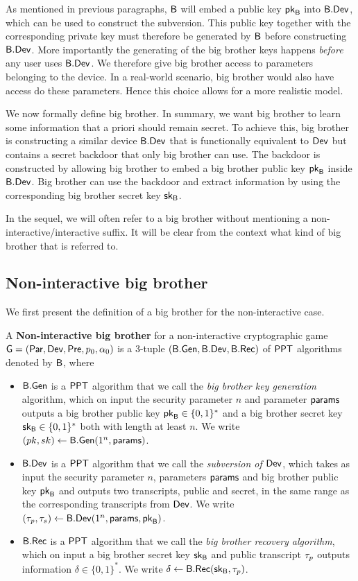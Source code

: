 As mentioned in previous paragraphs, $\mathsf{B}$ will embed a public key $\mathsf{pk}_{\mathsf{B}}$ into $\mathsf{B}.\mathsf{Dev}$, which can be used to construct the subversion. This public key together with the corresponding private key must therefore be generated by $\mathsf{B}$ before constructing $\mathsf{B}.\mathsf{Dev}$. More importantly the generating of the big brother keys happens \emph{before} any user uses $\mathsf{B}.\mathsf{Dev}$. We therefore give big brother access to parameters belonging to the device. In a real-world scenario, big brother would also have access do these parameters. Hence this choice allows for a more realistic model.

We now formally define big brother. In summary, we want big brother to learn some information that a priori should remain secret. To achieve this, big brother is constructing a similar device $\mathsf{B}.\mathsf{Dev}$ that is functionally equivalent to $\operatorname{\mathsf{Dev}}$ but contains a secret backdoor that only big brother can use. The backdoor is constructed by allowing big brother to embed a big brother public key $\mathsf{pk}_{\mathsf{B}}$ inside $\mathsf{B}.\mathsf{Dev}$. Big brother can use the backdoor and extract information by using the corresponding big brother secret key $\mathsf{sk}_{\mathsf{B}}$. 

In the sequel, we will often refer to a big brother without mentioning a non-interactive/interactive suffix. It will be clear from the context what kind of big brother that is referred to.

\subsection{Non-interactive big brother}

We first present the definition of a big brother for the non-interactive case. 

\begin{defn}
	A \textbf{Non-interactive big brother} for a non-interactive cryptographic game $\operatorname{\mathsf{G}}=\left(\operatorname{\mathsf{Par}},\operatorname{\mathsf{Dev}},\operatorname{\mathsf{Pre}},p_{0},\alpha_{0}\right)$ is a 3-tuple $(\mathsf{B}.\mathsf{Gen},\mathsf{B}.\mathsf{Dev}, \mathsf{B}.\mathsf{Rec})$ of $\mathsf{PPT}$ algorithms denoted by $\mathsf{B}$, where
	\begin{itemize}
	\itemsep-0.1em
		\item $\mathsf{B}.\mathsf{Gen}$ is a $\mathsf{PPT}$ algorithm that we call the \emph{big brother key generation} algorithm, which on input the security parameter $n$  and parameter $\mathsf{params}$ outputs a big brother public key $\mathsf{pk}_{\mathsf{B}}\in\{0,1\}^*$ and a big brother secret key $\mathsf{sk}_{\mathsf{B}}\in\{0,1\}^*$ both with length at least $n$. We write $(pk,sk)\leftarrow \mathsf{B}.\mathsf{Gen}(1^n, \mathsf{params})$. 
		\item $\mathsf{B}.\mathsf{Dev}$ is a $\mathsf{PPT}$ algorithm that we call the \textit{subversion of $\operatorname{\mathsf{Dev}}$}, which takes as input the security parameter $n$, parameters $\mathsf{params}$ and big brother public key $\mathsf{pk}_{\mathsf{B}}$ and outputs two transcripts, public and secret, in the same range as the corresponding transcripts from $\operatorname{\mathsf{Dev}}$. We write $(\tau_p,\tau_s)\leftarrow \mathsf{B}.\mathsf{Dev}(1^n,\mathsf{params},\mathsf{pk}_{\mathsf{B}})$. 
		\item $\mathsf{B}.\mathsf{Rec}$ is a $\mathsf{PPT}$ algorithm that we call the \textit{big brother recovery algorithm}, which on input a big brother secret key $\mathsf{sk}_{\mathsf{B}}$ and public transcript $\tau_p$ outputs information $\delta\in\{0,1\}^*$. We write $\delta\leftarrow \mathsf{B}.\mathsf{Rec}(\mathsf{sk}_{\mathsf{B}},\tau_p)$. 
	\end{itemize} 
\end{defn}

